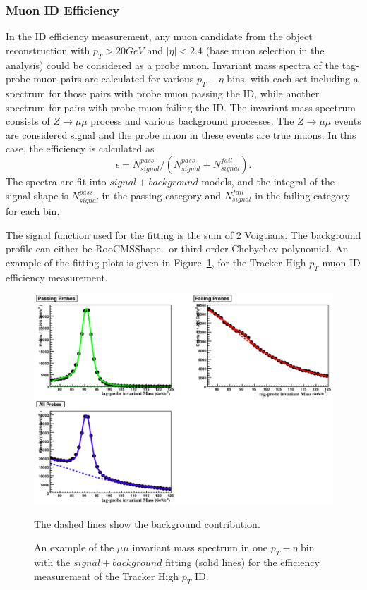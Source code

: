 \subsubsection{Muon ID Efficiency}
In the ID efficiency measurement, any muon candidate from the object reconstruction with $p_T > 20GeV$ and $|\eta|<2.4$ (base muon selection in the analysis) could be considered as a probe muon. Invariant mass spectra of the tag-probe muon pairs are calculated for various $p_T - \eta$ bins, with each set including a spectrum for those pairs with probe muon passing the ID, while another spectrum for pairs with probe muon failing the ID. The invariant mass spectrum consists of $Z\rightarrow \mu\mu$ process and various background processes. The $Z\rightarrow \mu\mu$ events are considered signal and the probe muon in these events are true muons. In this case, the efficiency is calculated as
\begin{equation}
\epsilon=N_{signal}^{pass}/(N_{signal}^{pass}+N_{signal}^{fail}). 
\end{equation}
The spectra are fit into $signal+background$ models, and the integral of the signal shape is $N_{signal}^{pass}$ in the passing category and $N_{signal}^{fail}$ in the failing category for each bin. 

\vspace{0.3cm}
The signal function used for the fitting is the sum of 2 Voigtians. The background profile can either be RooCMSShape~\cite{bg_cmsshape} or third order Chebychev polynomial. An example of the fitting plots is given in Figure~\ref{fig:bg_tnpmuonid}, for the Tracker High $p_T$ muon ID efficiency measurement.
\begin{figure}[htbp]
\begin{center}
\includegraphics[width=0.9\linewidth]{figures/bg_tnpmuonid.png}
\caption{An example of the $\mu\mu$ invariant mass spectrum in one $p_T - \eta$ bin with the $signal+background$ fitting (solid lines) for the efficiency measurement of the Tracker High $p_T$ ID.} The dashed lines show the background contribution.
\label{fig:bg_tnpmuonid}
\end{center}
\end{figure}

